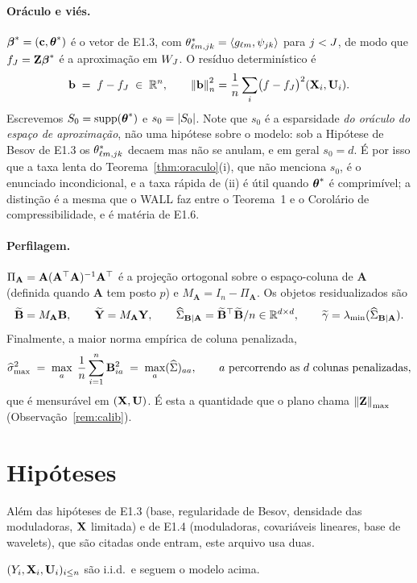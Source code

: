 \documentclass[11pt,a4paper]{article}
\newcommand{\lmin}{\lambda_{\min}}
\newcommand{\Amat}{\mathbf{A}}
\newcommand{\Bmat}{\mathbf{B}}
\newcommand{\Btil}{\widetilde{\Bmat}}
\newcommand{\PA}{\Pi_{\Amat}}
\newcommand{\MA}{M_{\Amat}}
\newcommand{\bbeta}{\boldsymbol{\beta}}
\newcommand{\betastar}{\bbeta^{*}}
\newcommand{\bb}{\mathbf{b}}
\newcommand{\bY}{\mathbf{Y}}
\newcommand{\smax}{\widehat{\sigma}_{\max}}
\newcommand{\gtil}{\widetilde{\gamma}}
\newcommand{\GBA}{\Gramhat_{\Bmat\mid\Amat}}
\begin{document}
\paragraph{Oráculo e viés.} $\betastar = (\bc, \thetastar)$ é o vetor de E1.3,
com $\theta^{*}_{\ell m,jk} = \langle g_{\ell m}, \psi_{jk} \rangle$
para $j < J$, de modo que $f_{J} = \bZ\betastar$ é a aproximação em $W_{J}$.
O resíduo determinístico é
\[
  \bb \;=\; f - f_{J} \;\in\; \R^{n},
  \qquad
  \normn{\bb}^{2} = \frac1n\sum_{i}\bigl(f - f_{J}\bigr)^{2}(\bX_{i},\bU_{i}).
\]
Escrevemos $S_{0} = \operatorname{supp}(\boldsymbol{\theta}^{*})$ e $s_{0} = |S_{0}|$.
Note que $s_{0}$ é a esparsidade \emph{do oráculo do espaço de aproximação},
não uma hipótese sobre o modelo: sob a Hipótese de Besov de E1.3 os
$\theta^{*}_{\ell m,jk}$ decaem mas não se anulam, e em geral $s_{0} = d$. É por isso que a taxa lenta
do Teorema~\ref{thm:oraculo}(i), que não menciona $s_{0}$, é o enunciado
incondicional, e a taxa rápida de (ii) é útil quando $\boldsymbol{\theta}^{*}$ é
comprimível; a distinção é a mesma que o WALL faz entre o Teorema~1 e o
Corolário de compressibilidade, e é matéria de E1.6.

\paragraph{Perfilagem.} $\PA = \Amat(\Amat\T\Amat)^{-1}\Amat\T$ é a projeção
ortogonal sobre o espaço-coluna de $\Amat$ (definida quando $\Amat$ tem posto
$p$) e $\MA = I_{n} - \PA$. Os objetos residualizados são
\[
  \Btil = \MA\Bmat, \qquad \widetilde{\bY} = \MA\bY,
  \qquad
  \GBA = \Btil\T\Btil/n \in \R^{d\times d},
  \qquad
  \gtil = \lmin(\GBA).
\]
Finalmente, a maior norma empírica de coluna penalizada,
\[
  \smax^{2} \;=\; \max_{a}\; \frac1n\sum_{i=1}^{n}\Bmat_{ia}^{2}
  \;=\; \max_{a} (\Gramhat)_{aa}, \qquad a \text{ percorrendo as } d
  \text{ colunas penalizadas},
\]
que é mensurável em $(\mathbf{X},\mathbf{U})$. É esta a quantidade que o plano chama
$\left\lVert \mathbf{Z} \right\rVert_{\max}$ (Observação~\ref{rem:calib}).

\section{Hipóteses}

Além das hipóteses de E1.3 (base, regularidade de Besov, densidade das
moduladoras, $\mathbf{X}$ limitada) e de E1.4 (moduladoras, covariáveis lineares,
base de wavelets), que são citadas onde entram, este arquivo usa duas.

\begin{assumption}[amostra]\label{ass:iid}
$(Y_{i},\mathbf{X}_{i},\mathbf{U}_{i})_{i \le n}$ são i.i.d.\ e seguem o modelo acima.
\end{assumption}
\end{document}
